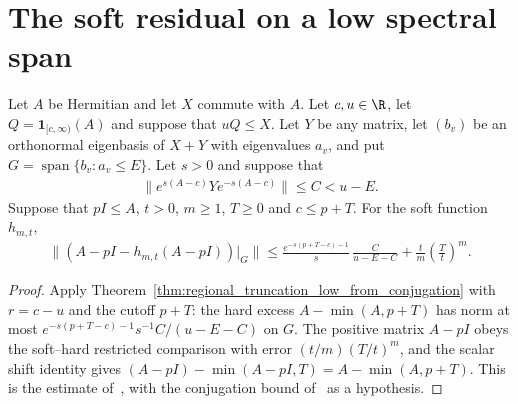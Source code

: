 \section{The soft residual on a low spectral span}
\label{sec:contraction_sums_residual}

\begin{theorem}
    \label{thm:soft_truncation_low_from_conjugation}
    \leanok
    Let $A$ be Hermitian and let $X$ commute with $A$. Let $c,u\in\R$, let
    $Q=\mathbf1_{[c,\infty)}(A)$ and suppose that $uQ\le X$. Let $Y$ be any
    matrix, let $(b_v)$ be an orthonormal eigenbasis of $X+Y$ with
    eigenvalues $a_v$, and put $G=\operatorname{span}\{b_v:a_v\le E\}$.
    Let $s>0$ and suppose that
    \begin{align*}
        \|e^{s(A-c)}Ye^{-s(A-c)}\|\le C<u-E.
    \end{align*}
    Suppose that $pI\le A$, $t>0$, $m\ge1$, $T\ge0$ and $c\le p+T$. For the
    soft function $h_{m,t}$,
    \begin{align*}
        \|(A-pI-h_{m,t}(A-pI))|_{G}\|
        \le\frac{e^{-s(p+T-c)-1}}{s}\,\frac{C}{u-E-C}
        +\frac{t}{m}\left(\frac{T}{t}\right)^m.
    \end{align*}
\end{theorem}

\begin{proof}
    \leanok
    Apply Theorem~\ref{thm:regional_truncation_low_from_conjugation} with
    $r=c-u$ and the cutoff $p+T$: the hard excess
    $A-\min(A,p+T)$ has norm at most
    $e^{-s(p+T-c)-1}s^{-1}C/(u-E-C)$ on $G$. The positive matrix $A-pI$
    obeys the soft--hard restricted comparison with error $(t/m)(T/t)^m$,
    and the scalar shift identity gives
    $(A-pI)-\min(A-pI,T)=A-\min(A,p+T)$. This is the estimate
    of~\cite[lemma on the exponential approximation, lines 1195--1255]{Arad2016RigorousRG},
    with the conjugation bound
    of~\cite[Theorem \texttt{lowspec}]{Arad2014Connecting} as a hypothesis.
\end{proof}
